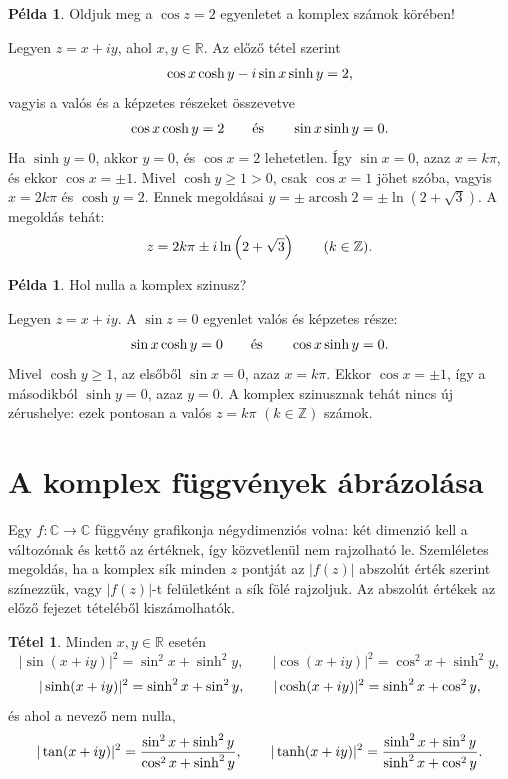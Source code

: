 \documentclass[11pt]{scrartcl}
\DeclareMathOperator{\arcosh}{arcosh}
\theoremstyle{definition}
\newtheorem{theorem}[definition]{Tétel}
\newtheorem{example}[definition]{Példa}
\theoremstyle{remark}
\begin{document}
\begin{example}
	Oldjuk meg a $\cos z = 2$ egyenletet a komplex számok körében!

	Legyen $z = x + iy$, ahol $x, y \in \mathbb{R}$. Az előző tétel szerint
	\[
		\cos x \cosh y - i \sin x \sinh y = 2\text,
	\]
	vagyis a valós és a képzetes részeket összevetve
	\[
		\cos x \cosh y = 2 \qquad\text{és}\qquad \sin x \sinh y = 0\text.
	\]
	Ha $\sinh y = 0$, akkor $y = 0$, és $\cos x = 2$ lehetetlen. Így
	$\sin x = 0$, azaz $x = k\pi$, és ekkor $\cos x = \pm 1$. Mivel
	$\cosh y \ge 1 > 0$, csak $\cos x = 1$ jöhet szóba, vagyis $x = 2k\pi$ és
	$\cosh y = 2$. Ennek megoldásai
	$y = \pm \arcosh 2 = \pm \ln\left(2 + \sqrt{3}\right)$. A megoldás tehát:
	\[
		z = 2k\pi \pm i \ln\left(2 + \sqrt{3}\right)
		\qquad (k \in \mathbb{Z})\text.
	\]
\end{example}

\begin{example}
	Hol nulla a komplex szinusz?

	Legyen $z = x + iy$. A $\sin z = 0$ egyenlet valós és képzetes része:
	\[
		\sin x \cosh y = 0 \qquad\text{és}\qquad \cos x \sinh y = 0\text.
	\]
	Mivel $\cosh y \ge 1$, az elsőből $\sin x = 0$, azaz $x = k\pi$. Ekkor
	$\cos x = \pm 1$, így a másodikból $\sinh y = 0$, azaz $y = 0$. A komplex
	szinusznak tehát nincs új zérushelye: ezek pontosan a valós
	$z = k\pi$ $(k \in \mathbb{Z})$ számok.
\end{example}

\section{A komplex függvények ábrázolása}

Egy $f\colon \mathbb{C} \to \mathbb{C}$ függvény grafikonja négydimenziós
volna: két dimenzió kell a változónak és kettő az értéknek, így közvetlenül
nem rajzolható le. Szemléletes megoldás, ha a komplex sík minden $z$ pontját
az $|f(z)|$ abszolút érték szerint színezzük, vagy $|f(z)|$-t felületként a
sík fölé rajzoljuk. Az abszolút értékek az előző fejezet tételéből
kiszámolhatók.

\begin{theorem}
	Minden $x, y \in \mathbb{R}$ esetén
	\[
		|\sin(x + iy)|^2 = \sin^2 x + \sinh^2 y, \qquad
		|\cos(x + iy)|^2 = \cos^2 x + \sinh^2 y,
	\]
	\[
		|\sinh(x + iy)|^2 = \sinh^2 x + \sin^2 y, \qquad
		|\cosh(x + iy)|^2 = \sinh^2 x + \cos^2 y\text,
	\]
	és ahol a nevező nem nulla,
	\[
		|\tan(x + iy)|^2 = \frac{\sin^2 x + \sinh^2 y}{\cos^2 x + \sinh^2 y},
		\qquad
		|\tanh(x + iy)|^2 = \frac{\sinh^2 x + \sin^2 y}{\sinh^2 x + \cos^2 y}\text.
	\]
\end{theorem}
\end{document}

